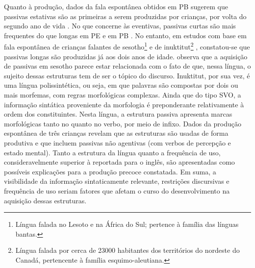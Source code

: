 \documentclass[output=paper]{LSP/langsci}
\begin{document}
Quanto à produção, dados da fala espontânea obtidos em PB sugerem que passivas estativas são as primeiras a serem produzidas por crianças, por volta do segundo ano de vida \citep{minellolopes2013}. No que concerne às eventivas, passivas curtas são mais frequentes do que longas em PE \citep{estrela2013} e em PB \citep{perotino1995}. No entanto, em estudos com base em fala espontânea de crianças falantes de sesotho\footnote{Língua falada no Lesoto e na África do Sul; pertence à família das línguas bantas.} \citep{demuth1990,demuth_etal2010} e de inuktitut\footnote{Língua falada por cerca de 23000 habitantes dos territórios do nordeste do Canadá, pertencente à família esquimo-aleutiana.} \citep{allencrago1996}, constatou-se que passivas longas são produzidas já aos dois anos de idade. \citet{demuth1990} observa que a aquisição de passivas em sesotho parece estar relacionada com o fato de que, nessa língua, o sujeito dessas estruturas tem de ser o tópico do discurso. Inuktitut, por sua vez, é uma língua polissintética, ou seja, em que palavras são compostas por dois ou mais morfemas, com regras morfológicas complexas. Ainda que do tipo SVO, a informação sintática proveniente da morfologia é preponderante relativamente à ordem dos constituintes. Nesta língua, a estrutura passiva apresenta marcas morfológicas tanto no  quanto no verbo, por meio de infixo. Dados da produção espontânea de três crianças revelam que as estruturas são usadas de forma produtiva e que incluem passivas não agentivas (com verbos de percepção e estado mental). Tanto a estrutura da língua quanto a frequência de uso, consideravelmente superior à reportada para o inglês, são apresentadas como possíveis explicações para a produção precoce constatada. Em suma, a visibilidade da informação sintaticamente relevante, restrições discursivas e frequência de uso seriam fatores que afetam o curso do desenvolvimento na aquisição dessas estruturas. 
\end{document}
